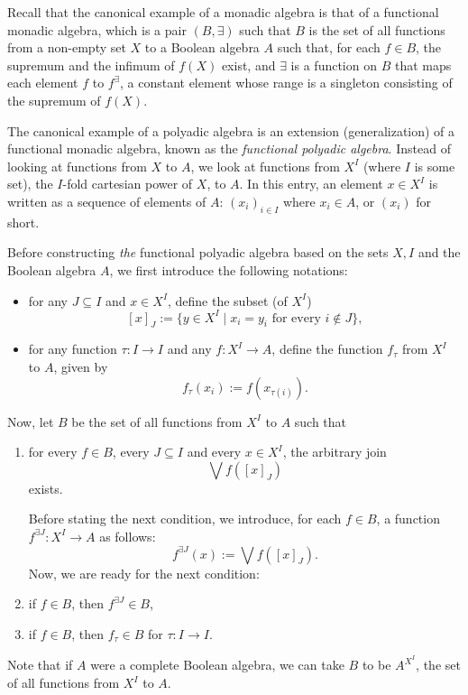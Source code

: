 \documentclass[12pt]{article}
\begin{document}
Recall that the canonical example of a monadic algebra is that of a functional monadic algebra, which is a pair $(B,\exists)$ such that $B$ is the set of all functions from a non-empty set $X$ to a Boolean algebra $A$ such that, for each $f\in B$, the supremum and the infimum of $f(X)$ exist, and $\exists$ is a function on $B$ that maps each element $f$ to $f^{\exists}$, a constant element whose range is a singleton consisting of the supremum of $f(X)$.

The canonical example of a polyadic algebra is an extension (generalization) of a functional monadic algebra, known as the \emph{functional polyadic algebra}.  Instead of looking at functions from $X$ to $A$, we look at functions from $X^I$ (where $I$ is some set), the $I$-fold cartesian power of $X$, to $A$.  In this entry, an element $x\in X^I$ is written as a sequence of elements of $A$: $(x_i)_{i\in I}$ where $x_i\in A$, or $(x_i)$ for short.

Before constructing \emph{the} functional polyadic algebra based on the sets $X,I$ and the Boolean algebra $A$, we first introduce the following notations:
\begin{itemize}
\item for any $J\subseteq I$ and $x\in X^I$, define the subset (of $X^I$) $$[x]_J:=\lbrace y\in X^I \mid x_i=y_i\mbox{ for every }i\notin J\rbrace,$$
\item for any function $\tau:I\to I$ and any $f:X^I\to A$, define the function $f_{\tau}$ from $X^I$ to $A$, given by $$f_{\tau}(x_i):=f(x_{\tau(i)}).$$
\end{itemize}

Now, let $B$ be the set of all functions from $X^I$ to $A$ such that
\begin{enumerate}
\item for every $f\in B$, every $J\subseteq I$ and every $x\in X^I$, the arbitrary join $$\bigvee f\left([x]_J\right)$$ exists.

Before stating the next condition, we introduce, for each $f\in B$, a function $f^{\exists J}:X^I\to A$ as follows: $$f^{\exists J}(x):=\bigvee f\left([x]_J\right).$$  Now, we are ready for the next condition:
\item if $f\in B$, then $f^{\exists J}\in B$,
\item if $f\in B$, then $f_{\tau}\in B$ for $\tau:I\to I$.
\end{enumerate}
Note that if $A$ were a complete Boolean algebra, we can take $B$ to be $A^{X^I}$, the set of all functions from $X^I$ to $A$.
\end{document}
